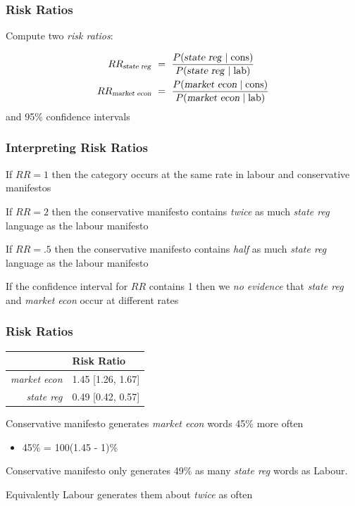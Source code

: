 \documentclass[11pt,compress,professionalfonts]{beamer}
\newcommand{\ita}{\begin{itemize}}
\newcommand{\itm}{\item[]}
\newcommand{\itz}{\end{itemize}}
\begin{document}
\begin{frame}[t]\frametitle{Risk Ratios}

Compute two \textsl{risk ratios}:

\begin{align*}
RR_{\text{\textsl{state reg}}} & ~=~ \frac{P(\text{\textsl{state reg}} \mid \text{cons})}
{P(\text{\textsl{state reg}} \mid \text{lab})}\\
RR_{\text{\textsl{market econ}}} & ~=~ \frac{P(\text{\textsl{market econ}} \mid \text{cons})}
{P(\text{\textsl{market econ}} \mid \text{lab})}
\end{align*}
and 95\% confidence intervals

%
%
%
\end{frame}
\begin{frame}[t]\frametitle{Interpreting Risk Ratios}

If $RR=1$ then the category occurs at the same rate in labour and conservative manifestos

If $RR=2$ then the conservative manifesto contains \textsl{twice} as much \textsl{state reg} language as the labour manifesto

If $RR=.5$ then the conservative manifesto contains \textsl{half} as much \textsl{state reg} language as the labour manifesto

If the confidence interval for $RR$ contains 1 then we \textsl{no evidence} that \textsl{state reg} and \textsl{market econ} occur at different rates

\end{frame}
\begin{frame}[t]\frametitle{Risk Ratios}
\begin{center}
\begin{tabular}{rl} \toprule
& Risk Ratio\\ \midrule
\textsl{market econ} & 1.45 [1.26, 1.67]\\
\textsl{state reg} & 0.49 [0.42, 0.57] \\ \bottomrule
\end{tabular}
\end{center}

Conservative manifesto generates \textsl{market econ} words 45\% more often
\ita
\itm 45\% = 100(1.45 - 1)\%
\itz
Conservative manifesto only generates 49\% as many \textsl{state reg} words as Labour.

Equivalently Labour generates them about \textsl{twice} as often

\end{frame}
\end{document}
